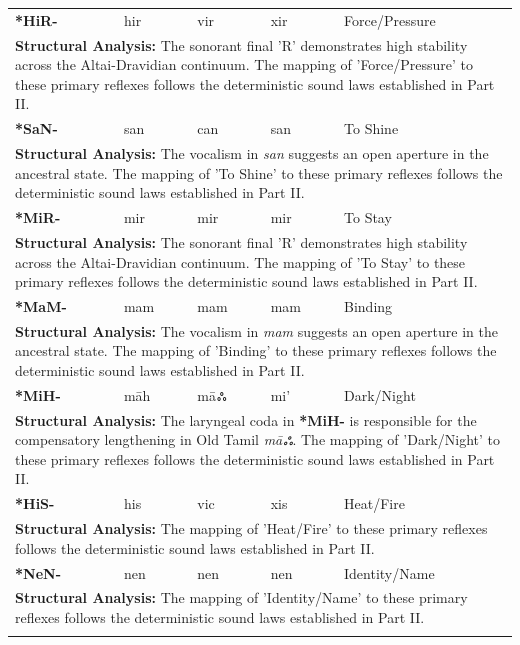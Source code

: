 \begin{longtable}{p{} p{} p{} p{} p{}}
\textbf{*HiR-} & hir & vir & xir & Force/Pressure \\ 
\multicolumn{5}{p{\textwidth}}{\small \textbf{Structural Analysis:} The sonorant final 'R' demonstrates high stability across the Altai-Dravidian continuum. The mapping of 'Force/Pressure' to these primary reflexes follows the deterministic sound laws established in Part II.} \\ \addlinespace[15pt] 
\textbf{*SaN-} & san & can & san & To Shine \\ 
\multicolumn{5}{p{\textwidth}}{\small \textbf{Structural Analysis:} The vocalism in \textit{san} suggests an open aperture in the ancestral state. The mapping of 'To Shine' to these primary reflexes follows the deterministic sound laws established in Part II.} \\ \addlinespace[15pt] 
\textbf{*MiR-} & mir & mir & mir & To Stay \\ 
\multicolumn{5}{p{\textwidth}}{\small \textbf{Structural Analysis:} The sonorant final 'R' demonstrates high stability across the Altai-Dravidian continuum. The mapping of 'To Stay' to these primary reflexes follows the deterministic sound laws established in Part II.} \\ \addlinespace[15pt] 
\textbf{*MaM-} & mam & mam & mam & Binding \\ 
\multicolumn{5}{p{\textwidth}}{\small \textbf{Structural Analysis:} The vocalism in \textit{mam} suggests an open aperture in the ancestral state. The mapping of 'Binding' to these primary reflexes follows the deterministic sound laws established in Part II.} \\ \addlinespace[15pt] 
\textbf{*MiH-} & māh & māஃ & mi' & Dark/Night \\ 
\multicolumn{5}{p{\textwidth}}{\small \textbf{Structural Analysis:} The laryngeal coda in \textbf{*MiH-} is responsible for the compensatory lengthening in Old Tamil \textit{māஃ}. The mapping of 'Dark/Night' to these primary reflexes follows the deterministic sound laws established in Part II.} \\ \addlinespace[15pt] 
\textbf{*HiS-} & his & vic & xis & Heat/Fire \\ 
\multicolumn{5}{p{\textwidth}}{\small \textbf{Structural Analysis:}  The mapping of 'Heat/Fire' to these primary reflexes follows the deterministic sound laws established in Part II.} \\ \addlinespace[15pt] 
\textbf{*NeN-} & nen & nen & nen & Identity/Name \\ 
\multicolumn{5}{p{\textwidth}}{\small \textbf{Structural Analysis:}  The mapping of 'Identity/Name' to these primary reflexes follows the deterministic sound laws established in Part II.} \\ \addlinespace[15pt] 

\end{longtable}
